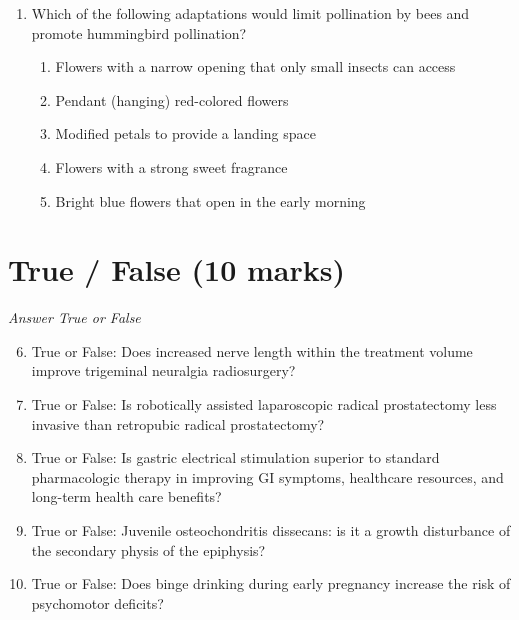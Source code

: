 \documentclass[12pt]{article}
\begin{document}
\begin{enumerate}[label=\arabic*.]
\begin{enumerate}[label=(\alph*)]
    \item sympatric selection.
    \item artificial selection.
    \item allopatric selection.
    \item directional selection.
\end{enumerate}
\item Which of the following adaptations would limit pollination by bees and promote hummingbird pollination?
\begin{enumerate}[label=(\alph*)]
    \item Flowers with a narrow opening that only small insects can access
    \item Pendant (hanging) red-colored flowers
    \item Modified petals to provide a landing space
    \item Flowers with a strong sweet fragrance
    \item Bright blue flowers that open in the early morning
\end{enumerate}
\end{enumerate}

\section*{True / False (10 marks)}
\textit{Answer True or False}
\begin{enumerate}[label=\arabic*.]
\setcounter{enumi}{5}
\item True or False: Does increased nerve length within the treatment volume improve trigeminal neuralgia radiosurgery?
\item True or False: Is robotically assisted laparoscopic radical prostatectomy less invasive than retropubic radical prostatectomy?
\item True or False: Is gastric electrical stimulation superior to standard pharmacologic therapy in improving GI symptoms, healthcare resources, and long-term health care benefits?
\item True or False: Juvenile osteochondritis dissecans: is it a growth disturbance of the secondary physis of the epiphysis?
\item True or False: Does binge drinking during early pregnancy increase the risk of psychomotor deficits?
\end{enumerate}
\end{document}

